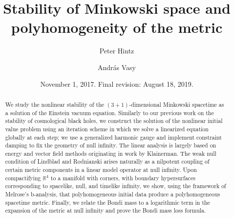 \documentclass[reqno,11pt,letterpaper]{amsart}
\numberwithin{equation}{section}
\numberwithin{figure}{section}
\theoremstyle{definition}
\theoremstyle{remark}
\newcommand{\R}{\mathbb{R}}
\begin{document}
\title[Stability of Minkowski space]{Stability of Minkowski space and polyhomogeneity of the metric}

\date{November 1, 2017. Final revision: August 18, 2019.}

\author{Peter Hintz}
\address{Department of Mathematics, University of California, Berkeley, CA 94720-3840, USA}

\author{Andr\'as Vasy}
\address{Department of Mathematics, Stanford University, Stanford, CA 94305-2125, USA}

\begin{abstract}
  We study the nonlinear stability of the $(3+1)$-dimensional Minkowski spacetime as a solution of the Einstein vacuum equation. Similarly to our previous work on the stability of cosmological black holes, we construct the solution of the nonlinear initial value problem using an iteration scheme in which we solve a linearized equation globally at each step; we use a generalized harmonic gauge and implement constraint damping to fix the geometry of null infinity. The linear analysis is largely based on energy and vector field methods originating in work by Klainerman. The weak null condition of Lindblad and Rodnianski arises naturally as a nilpotent coupling of certain metric components in a linear model operator at null infinity. Upon compactifying $\R^4$ to a manifold with corners, with boundary hypersurfaces corresponding to spacelike, null, and timelike infinity, we show, using the framework of Melrose's b-analysis, that polyhomogeneous initial data produce a polyhomogeneous spacetime metric. Finally, we relate the Bondi mass to a logarithmic term in the expansion of the metric at null infinity and prove the Bondi mass loss formula.
\end{abstract}

\maketitle


\setlength{\parskip}{0.00in}
\tableofcontents
\setlength{\parskip}{0.05in}
\end{document}
